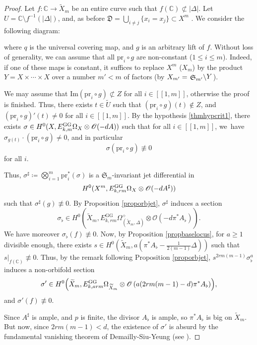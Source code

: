 \documentclass[JEP,XML,SOM,Unicode, NoEqCountersInSection,NoFloatCountersInSection,published]{cedram}
\let\mathcal\mathscr
\newcommand{\llbracket}{[\![}
\newcommand{\rrbracket}{]\!]}
\let\ts\textstyle
\newcommand{\rGG}{\mathrm{GG}}
\newcommand{\pr}{\mathrm{pr}}
\newcommand{\reg}{\mathrm{reg}}
\theoremstyle{theorem}
\theoremstyle{definition}
\newcommand{\quotient}[2]{{\left.\raisebox{-.08em}{$#1$}\middle\backslash\raisebox{.08em}{$#2$}\right.}}
\begin{document}
\begin{proof}
Let $f : \mathbb C \to \widetilde{X}_m$ be an entire curve such that $f(\mathbb C) \not\subset | \Delta |$. Let $U = \mathbb C \setminus f^{-1}(|\Delta|)$, and, as before $\mathfrak D = \bigcup_{i \neq j} \{ x_i = x_j\} \subset X^m$ . We consider the following diagram:
\begin{center}
\end{center}
where $q$ is the universal covering map, and $g$ is an arbitrary lift of $f$. Without loss of generality, we can assume that all $\pr_i \circ g$ are non-constant ($1 \leq i \leq m$). Indeed, if one of these maps is constant, it suffices to replace $X^m$ (\resp $X_m$) by the product $Y = X \times \cdots \times X$ over a number $m' < m$ of factors (\resp by $X_{m'} = \quotient{{\mathfrak S}_{m'}}{Y}$).

We may assume that $\mathrm{Im}(\pr_i \circ g) \not\subset Z$ for all $i\in\llbracket1,m\rrbracket$, otherwise the proof is finished. Thus, there exists $t \in \widetilde{U}$ such that $(\pr_i \circ g)(t) \not\in Z$, and $(\pr_i \circ g)'(t) \neq 0$ for all $i\in\llbracket1,m\rrbracket$. By the hypothesis \eqref{thmhypcrit1}, there exists $\sigma \in H^0 (X, E_{k,m}^{\rGG} \Omega_X \otimes\nobreak \mathcal O(- d A))$ such that for all $i\in\llbracket1,m\rrbracket$, we~have $\sigma_{g(t)}\cdot (\pr_i \circ g) \neq 0$, and in particular
\[
\sigma( \pr_i \circ g) \not\equiv 0
\]
for all $i$.

Thus, $\sigma^{\sharp}\coloneqq \bigotimes_{i=1}^m \pr_i^\ast(\sigma)$ is a $\mathfrak{S}_m$-invariant jet differential in
\[
H^0(X^m, E_{k, rm}^{\rGG} \Omega_X \otimes\nobreak \mathcal O(- d A^\sharp))
\]
such that $\sigma^\sharp(g) \not\equiv 0$. By Proposition \ref{proporbjet}, $\sigma^\sharp$ induces a section
\[
\sigma_\flat \in H^0(\widetilde{X}_m, E_{k, rm}^{\rGG} \Omega_{(\widetilde{X}_m, \Delta)}^\div \otimes \mathcal O( - d \pi^\ast A_{\flat})).
\]
We have moreover $\sigma_\flat(f) \not\equiv 0$. Now, by Proposition \ref{propbaselocus}, for $a \geq 1$ divisible enough, there exists $s \in H^0 (\widetilde{X}_m, a ( \pi^\ast A_\flat - \frac{1}{2(m-1)} \Delta))$ such that $s|_{f(\mathbb C)} \not\equiv 0$. Thus, by the remark following Proposition \ref{proporbjet}, $s^{2rm(m-1)} \sigma_{\flat}^a$ induces a non-orbifold section
\[
\sigma' \in H^0 \Bigl(\widetilde{X}_m, E_{k, arm}^{\rGG} \Omega_{\widetilde{X}_m} \otimes \mathcal O\left(a(2rm(m-1) - d) \pi^\ast A_{\flat} \right)\Bigr),
\]
and $\sigma'(f) \not\equiv 0$.

Since \(A^{\sharp}\) is ample, and \(p\) is finite, the divisor $A_{\flat}$ is ample, so \(\pi^{\ast} A_{\flat}\) is big on $\widetilde{X}_m$. But now, since $2rm(m-1) < d$, the existence of \(\sigma'\) is absurd by the fundamental vanishing theorem of Demailly-Siu-Yeung (see \cite{dem12a}).
\end{proof}
\end{document}
